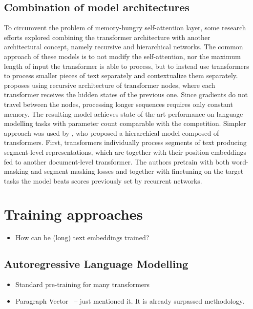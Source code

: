 \subsection{Combination of model architectures}

To circumvent the problem of memory-hungry self-attention layer, some research
efforts explored combining the transformer architecture with another
architectural concept, namely recursive and hierarchical networks. The common
approach of these models is to not modify the self-attention, nor the maximum
length of input the transformer is able to process, but to instead use
transformers to process smaller pieces of text separately and contextualize
them separately. \cite{dai2019transformer} proposes using recursive
architecture of transformer nodes, where each transformer receives the hidden
states of the previous one. Since gradients do not travel between the nodes,
processing longer sequences requires only constant memory. The resulting model
achieves state of the art performance on language modelling tasks with parameter count
comparable with the competition. Simpler approach was used by
\cite{yang2020beyond}, who proposed a hierarchical model composed of
transformers. First, transformers individually process segments of text
producing segment-level representations, which are together with their position
embeddings fed to another document-level transformer. The authors pretrain with
both word-masking and segment masking losses and together with finetuning on
the target tasks the model beats scores previously set by recurrent networks.


\section{Training approaches}

\begin{itemize}

    \item How can be (long) text embeddings trained?

\end{itemize}

\subsection{Autoregressive Language Modelling}

\begin{itemize}

    \item Standard pre-training for many transformers

    \item Paragraph Vector~\citep{le2014distributed} -- just mentioned it. It is
    already surpassed methodology.


\end{itemize}

